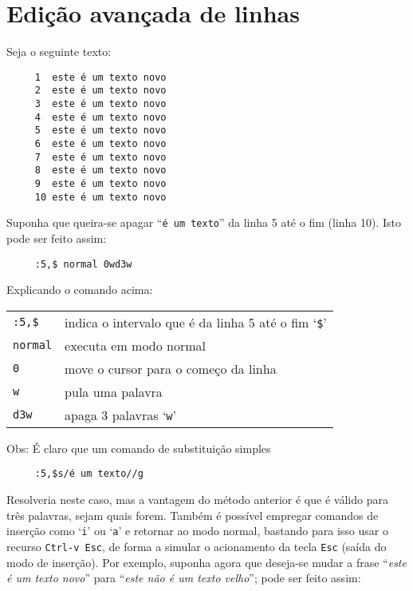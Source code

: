 \section{Edição avançada de linhas}

Seja o seguinte texto:

\begin{verbatim}
     1  este é um texto novo
     2  este é um texto novo
     3  este é um texto novo
     4  este é um texto novo
     5  este é um texto novo
     6  este é um texto novo
     7  este é um texto novo
     8  este é um texto novo
     9  este é um texto novo
     10 este é um texto novo
\end{verbatim}

Suponha que queira-se apagar ``{\tt é um texto}'' da linha 5 até o fim (linha
10). Isto pode ser feito assim:

\begin{verbatim}
     :5,$ normal 0wd3w
\end{verbatim}

Explicando o comando acima:

\begin{table}[htb]\begin{center} \begin{tabular}{ll} \hline
     \verb|:5,$| & indica o intervalo que é da linha 5 até o fim `\verb|$|'\\
     \verb|normal| & executa em modo normal\\
     \verb|0| & move o cursor para o começo da linha\\
     \verb|w| & pula uma palavra\\
     \verb|d3w| & apaga 3 palavras `\verb|w|'\\
\hline \end{tabular}\end{center}\end{table}

Obs: É claro que um comando de substituição simples

\begin{verbatim}
     :5,$s/é um texto//g
\end{verbatim}

Resolveria neste caso, mas a vantagem do método anterior é que
é válido para três palavras, sejam quais forem.  
Também é possível empregar comandos de inserção como `{\tt i}' ou `{\tt a}' e
retornar ao modo normal, bastando para isso usar o recurso \verb|Ctrl-v Esc|,
de forma a simular o acionamento da tecla \verb|Esc| (saída do modo de
inserção). Por exemplo, suponha agora que deseja-se mudar a frase ``{\em este
é um texto novo}'' para ``{\em este não é um texto velho}''; pode ser feito
assim:

